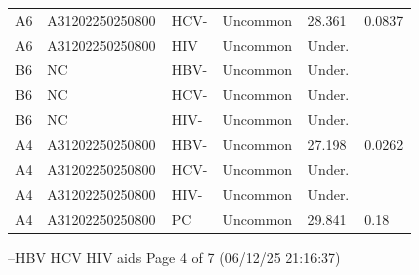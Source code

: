 \documentclass[UTF8,10pt,a4paper,fontset=fandol]{ctexart}
\begin{document}
\begin{center}
{\begin{minipage}{0.92\textheight}
\begin{tabular}{p{0.07\linewidth}p{0.23\linewidth}p{0.12\linewidth}p{0.16\linewidth}p{0.12\linewidth}p{0.10\linewidth}}
A6 & A31202250250800 & HCV- & Uncommon & 28.361 & 0.0837 \\
A6 & A31202250250800 & HIV & Uncommon & Under. & \\
B6 & NC & HBV- & Uncommon & Under. & \\
B6 & NC & HCV- & Uncommon & Under. & \\
B6 & NC & HIV- & Uncommon & Under. & \\
A4 & A31202250250800 & HBV- & Uncommon & 27.198 & 0.0262 \\
A4 & A31202250250800 & HCV- & Uncommon & Under. & \\
A4 & A31202250250800 & HIV- & Uncommon & Under. & \\
A4 & A31202250250800 & PC & Uncommon & 29.841 & 0.18 \\
\hline
\end{tabular}

\vspace{1em}

--HBV HCV HIV aids
\hfill
Page 4 of 7 (06/12/25 21:16:37)

\end{minipage}%
}
\end{center}


\newpage
\end{document}
